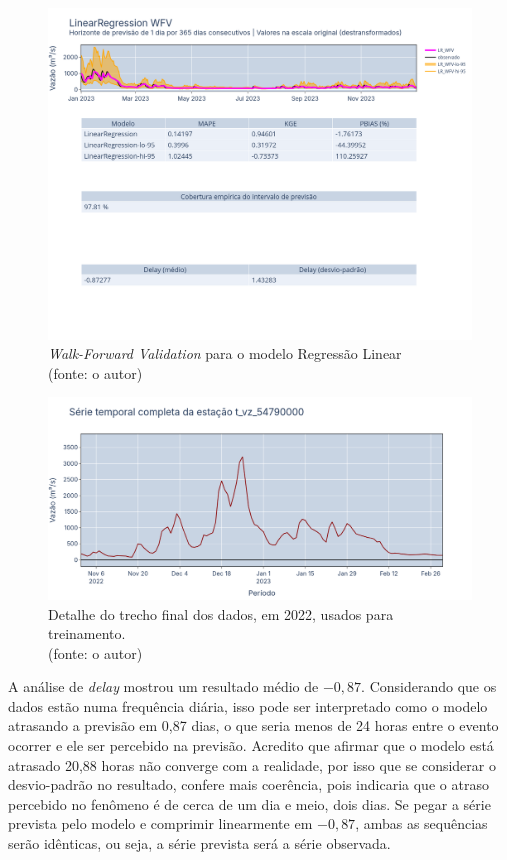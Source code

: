 \begin{figure}[!h]
	\centering
	\includegraphics[scale=0.33]{Figuras/jequiti/resultados/LR_WFV_LOG.png}
	\caption{\textit{Walk-Forward Validation} para o modelo Regressão Linear\\(fonte: o autor)}
	\label{fig:jequiti_LR_WFV_LOG}
\end{figure}

\begin{figure}[!h]
	\centering
	\includegraphics[scale=0.33]{Figuras/jequiti/resultados/LR_final_2022_detalhe.png}
	\caption{Detalhe do trecho final dos dados, em 2022, usados para treinamento.\\(fonte: o autor)}
	\label{fig:jequiti_LR_final_2022_detalhe}
\end{figure}

A análise de \textit{delay} mostrou um resultado médio de $-0,87$. Considerando que os dados estão numa frequência diária, isso pode ser interpretado como o modelo atrasando a previsão em 0,87 dias, o que seria menos de 24 horas entre o evento ocorrer e ele ser percebido na previsão. Acredito que afirmar que o modelo está atrasado 20,88 horas não converge com a realidade, por isso que se considerar o desvio-padrão no resultado, confere mais coerência, pois indicaria que o atraso percebido no fenômeno é de cerca de um dia e meio, dois dias. Se pegar a série prevista pelo modelo e comprimir linearmente em $-0,87$, ambas as sequências serão idênticas, ou seja, a série prevista será a série observada.

